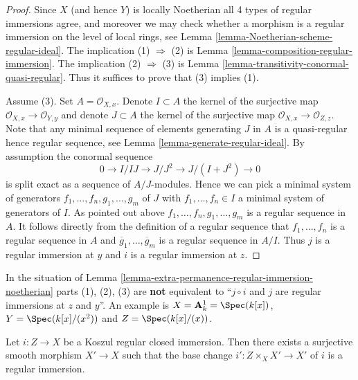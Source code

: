 \begin{proof}
Since $X$ (and hence $Y$) is locally Noetherian all 4 types of regular
immersions agree, and moreover we may check whether a morphism is a
regular immersion on the level of local rings, see
Lemma \ref{lemma-Noetherian-scheme-regular-ideal}.
The implication (1) $\Rightarrow$ (2) is
Lemma \ref{lemma-composition-regular-immersion}.
The implication (2) $\Rightarrow$ (3) is
Lemma \ref{lemma-transitivity-conormal-quasi-regular}.
Thus it suffices to prove that (3) implies (1).

\medskip\noindent
Assume (3). Set $A = \mathcal{O}_{X, x}$. Denote $I \subset A$ the kernel
of the surjective map $\mathcal{O}_{X, x} \to \mathcal{O}_{Y, y}$ and
denote $J \subset A$ the kernel
of the surjective map $\mathcal{O}_{X, x} \to \mathcal{O}_{Z, z}$.
Note that any minimal sequence of elements generating $J$ in $A$
is a quasi-regular hence regular sequence, see
Lemma \ref{lemma-generate-regular-ideal}.
By assumption the conormal sequence
$$
0 \to I/IJ \to J/J^2 \to J/(I + J^2) \to 0
$$
is split exact as a sequence of $A/J$-modules. Hence we can pick
a minimal system of generators $f_1, \ldots, f_n, g_1, \ldots, g_m$
of $J$ with $f_1, \ldots, f_n \in I$ a minimal system of generators of $I$.
As pointed out above $f_1, \ldots, f_n, g_1, \ldots, g_m$ is a regular
sequence in $A$. It follows directly from the definition of a regular
sequence that $f_1, \ldots, f_n$ is a regular sequence in $A$ and
$\overline{g}_1, \ldots, \overline{g}_m$ is a regular sequence in
$A/I$. Thus $j$ is a regular immersion at $y$ and $i$ is a regular
immersion at $z$.
\end{proof}

\begin{remark}
\label{remark-not-always-extra-permanence}
In the situation of
Lemma \ref{lemma-extra-permanence-regular-immersion-noetherian}
parts (1), (2), (3) are {\bf not} equivalent to
``$j \circ i$ and $j$ are regular immersions at $z$ and $y$''.
An example is $X = \mathbf{A}^1_k = \Spec(k[x])$,
$Y = \Spec(k[x]/(x^2))$ and $Z = \Spec(k[x]/(x))$.
\end{remark}

\begin{lemma}
\label{lemma-koszul-regular-smooth-locally-regular}
Let $i : Z \to X$ be a Koszul regular closed immersion.
Then there exists a surjective smooth morphism $X' \to X$ such
that the base change $i' : Z \times_X X' \to X'$ of $i$ is
a regular immersion.
\end{lemma}

